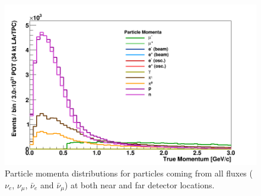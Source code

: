 \begin{figure}[h!]
  \centering
\includegraphics[scale=0.5]{figures/True_Momenta_per_Particle.png}
  \caption{Particle momenta distributions for particles coming from all fluxes ($\nu_e$, $\nu_\mu$, $\bar \nu_e$ and $\bar \nu_\mu$) at both near and far detector locations.  }
  \label{fig:particle_momentav2}
\end{figure}

%

